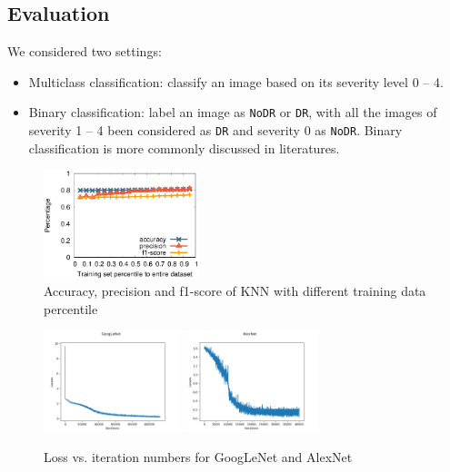 \subsection{Evaluation}
We considered two settings: 
\begin{itemize}
\item Multiclass classification: classify an image based on its severity level 0 -- 4. 
\item Binary classification: label an image as \texttt{NoDR} or \texttt{DR}, with all the images of severity 1 -- 4 been considered as \texttt{DR} and severity 0 as \texttt{NoDR}. Binary classification is more commonly discussed in literatures. 
\end{itemize}

\begin{figure}[t]
\centering
\includegraphics[width=0.4\textwidth]{knn.eps}
\caption{Accuracy, precision and f1-score of KNN with different training data percentile }
\label{knnacc}
\end{figure}


\begin{figure}[t]
\centering
\includegraphics[width=0.35\textwidth]{google_loss.png}
\includegraphics[width=0.35\textwidth]{alex_loss.png}
\caption{Loss vs. iteration numbers for GoogLeNet and AlexNet}
\label{cnn_loss}
\end{figure}


